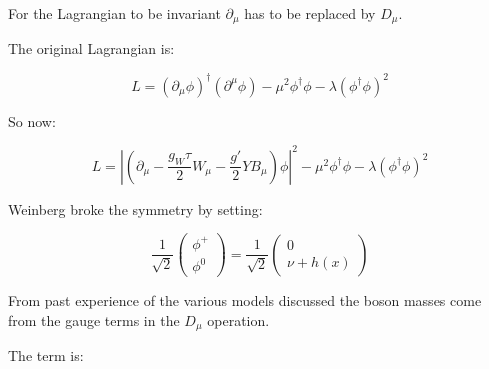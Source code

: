For the Lagrangian to be invariant $\partial_{\mu}$ has to be replaced by $D_{\mu}$.

The original Lagrangian is:

\[
  L = \left(\partial_{\mu}\phi\right)^{\dagger}\left(\partial^{\mu}\phi\right) - \mu^2 \phi^{\dagger}\phi - \lambda\left(\phi^{\dagger}\phi\right)^2
\]

So now:

\[
  L = \left| \left(\partial_{\mu} - \frac{g_W\tau}{2}W_{\mu} - \frac{g'}{2}YB_{\mu}\right)\phi\right|^2 - \mu^2\phi^{\dagger}\phi - \lambda\left(\phi^{\dagger}\phi\right)^2
\]

Weinberg broke the symmetry by setting:

\[
  \frac{1}{\sqrt{2}}
  \left(
  \begin{array}{c}
    \phi^+ \\
    \phi^0
  \end{array}
  \right)
  =
  \frac{1}{\sqrt{2}}
  \left(
  \begin{array}{c}
    0 \\
    \nu + h(x)
  \end{array}
  \right)
\]

From past experience of the various models discussed the boson masses come from the gauge terms in the $D_{\mu}$ operation.

The term is:

